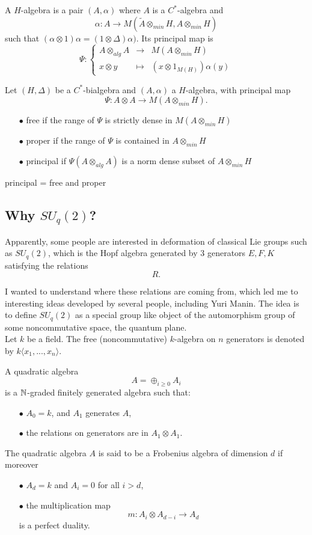 A $H$-algebra is a pair $(A,\alpha)$ where $A$ is a $C^*$-algebra and 
\[\alpha : A\rightarrow M(\tilde A \otimes_{min} H , A\otimes_{min} H)\]
such that $(\alpha\otimes 1) \alpha = (1 \otimes \Delta )\alpha)$. Its principal map is 
\[\Psi : \left\{ \begin{array}{rcl}
A\otimes_{alg} A & \rightarrow & M(A\otimes_{min} H) \\
x\otimes y & \mapsto & (x \otimes 1_{M(H)})\alpha (y)
\end{array}\right.\]

Let $(H,\Delta)$ be a $C^*$-bialgebra and $(A,\alpha)$ a $H$-algebra, with principal map
\[\Psi: A\otimes A\rightarrow M(A\otimes_{min} H).\]
\begin{itemize}
\item[$\bullet$] free if the range of $\Psi$ is strictly dense in $M(A\otimes_{min} H)$
\item[$\bullet$] proper if the range of $\Psi$ is contained in $A\otimes_{min} H$
\item[$\bullet$] principal if $\Psi(A\otimes_{alg}A )$ is a norm dense subset of $A\otimes_{min} H$
\end{itemize}
principal = free and proper

\subsection{Why $SU_q(2)$?}

Apparently, some people are interested in deformation of classical Lie groups such as $SU_q(2)$, which is the Hopf algebra generated by $3$ generators $E,F,K$ satisfying the relations 
\[R.\]

I wanted to understand where these relations are coming from, which led me to interesting ideas developed by several people, including Yuri Manin. The idea is to define $SU_q(2)$ as a special group like object of the automorphism group of some noncommutative space, the quantum plane.\\

Let $k$ be a field. The free (noncommutative) $k$-algebra on $n$ generators is denoted by $k\langle x_1,... ,x_n\rangle$.

\begin{definition}
A quadratic algebra 
\[A= \oplus_{i\geq 0} A_i\] 
is a $\mathbb N$-graded finitely generated algebra such that:
\begin{itemize}
\item[$\bullet$] $A_0 = k$, and $A_1$ generates $A$,
\item[$\bullet$] the relations on generators are in $A_1 \otimes A_1$. 
\end{itemize} 
The quadratic algebra $A$ is said to be a Frobenius algebra of dimension $d$ if moreover 
\begin{itemize}
\item[$\bullet$] $A_d= k$ and $A_i =0$ for all $i>d$,
\item[$\bullet$] the multiplication map
\[m : A_i \otimes A_{d-i} \rightarrow A_d\]
is a perfect duality.
\end{itemize}
\end{definition}

